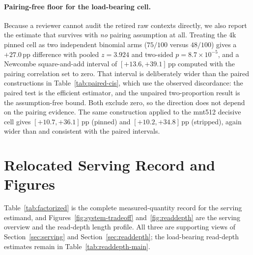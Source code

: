 \FloatBarrier

\paragraph{Pairing-free floor for the load-bearing cell.}
Because a reviewer cannot audit the retired raw contexts directly, we also
report the estimate that survives with \emph{no} pairing assumption at all.
Treating the 4k pinned cell as two independent binomial arms
($75/100$ versus $48/100$) gives a $+27.0$\,pp difference with pooled
$z=3.924$ and two-sided $p=8.7\times10^{-5}$, and a Newcombe square-and-add
interval of $[+13.6,+39.1]$\,pp computed with the pairing correlation set to
zero.  That interval is deliberately wider than the paired constructions in
Table~\ref{tab:paired-cis}, which use the observed discordance: the paired test
is the efficient estimator, and the unpaired two-proportion result is the
assumption-free bound.  Both exclude zero, so the direction does not depend on
the pairing evidence.  The same construction applied to the mnt512 decisive
cell gives $[+10.7,+36.1]$\,pp (pinned) and $[+10.2,+34.8]$\,pp (stripped),
again wider than and consistent with the paired intervals.

\FloatBarrier

\section{Relocated Serving Record and Figures}
\label{app:figures}

Table~\ref{tab:factorized} is the complete measured-quantity record for the
serving estimand, and Figures~\ref{fig:system-tradeoff} and~\ref{fig:readdepth}
are the serving overview and the read-depth length profile.  All three are
supporting views of Section~\ref{sec:serving} and Section~\ref{sec:readdepth};
the load-bearing read-depth estimates remain in Table~\ref{tab:readdepth-main}.

